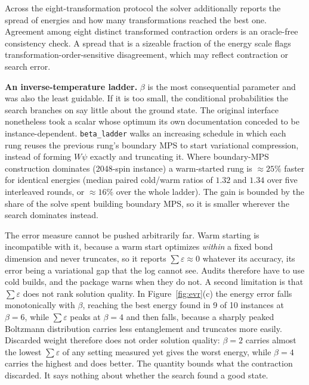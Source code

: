 \documentclass[preprint,12pt,a4paper]{elsarticle}
\begin{document}
Across the eight-transformation protocol the solver additionally reports the spread
of energies and how many transformations reached the best one. Agreement among eight
distinct transformed contraction orders is an oracle-free consistency check. A
spread that is a sizeable fraction of the energy scale flags
transformation-order-sensitive disagreement, which may reflect contraction or search
error.

\textbf{An inverse-temperature ladder.} $\beta$ is the most consequential
parameter and was also the least guidable. If it is too small, the conditional
probabilities the search branches on say little about the ground state. The
original interface nonetheless took a scalar whose optimum its own documentation
conceded to be instance-dependent. \texttt{beta\_ladder} walks an increasing
schedule in which each rung reuses the previous rung's boundary MPS to start
variational compression, instead of forming $W\psi$ exactly and truncating it.
Where boundary-MPS construction dominates (2048-spin instance) a warm-started rung
is ${\approx}25\%$ faster for identical energies (median paired cold/warm ratios of
$1.32$ and $1.34$ over five interleaved rounds, or ${\approx}16\%$ over the whole
ladder). The gain is bounded by the share of the solve spent building boundary
MPS, so it is smaller wherever the search dominates instead.

The error measure cannot be pushed arbitrarily far. Warm starting is incompatible
with it, because a warm start optimizes \emph{within} a fixed bond dimension and
never truncates, so it reports $\sum\varepsilon\approx0$ whatever its accuracy, its
error being a variational gap that the log cannot see. Audits therefore have to use
cold builds, and the package warns when they do not. A second limitation is that
$\sum\varepsilon$ does not rank solution quality. In Figure~\ref{fig:evr}(c) the
energy error falls monotonically with $\beta$, reaching the best energy found in
9 of 10 instances at $\beta=6$, while $\sum\varepsilon$ peaks at $\beta=4$ and
then falls, because a sharply peaked Boltzmann distribution carries less
entanglement and truncates more easily. Discarded weight therefore does not order
solution quality: $\beta=2$ carries almost the lowest $\sum\varepsilon$ of any
setting measured yet gives the worst energy, while $\beta=4$ carries the highest
and does better. The quantity bounds what the contraction discarded. It says
nothing about whether the search found a good state.
\end{document}
